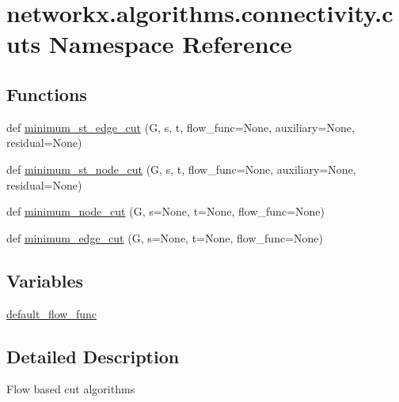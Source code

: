 \hypertarget{namespacenetworkx_1_1algorithms_1_1connectivity_1_1cuts}{}\section{networkx.\+algorithms.\+connectivity.\+cuts Namespace Reference}
\label{namespacenetworkx_1_1algorithms_1_1connectivity_1_1cuts}
\subsection*{Functions}
\begin{DoxyCompactItemize}
\item 
def \hyperlink{namespacenetworkx_1_1algorithms_1_1connectivity_1_1cuts_a1c011e06a29132aba8d9d4a0b79506ae}{minimum\+\_\+st\+\_\+edge\+\_\+cut} (G, s, t, flow\+\_\+func=None, auxiliary=None, residual=None)
\item 
def \hyperlink{namespacenetworkx_1_1algorithms_1_1connectivity_1_1cuts_a3a3ae336abcce0cc7ca6aac034920272}{minimum\+\_\+st\+\_\+node\+\_\+cut} (G, s, t, flow\+\_\+func=None, auxiliary=None, residual=None)
\item 
def \hyperlink{namespacenetworkx_1_1algorithms_1_1connectivity_1_1cuts_a95772f88e75165ca90e55d41fcaa0476}{minimum\+\_\+node\+\_\+cut} (G, s=None, t=None, flow\+\_\+func=None)
\item 
def \hyperlink{namespacenetworkx_1_1algorithms_1_1connectivity_1_1cuts_ad566bf6020381d58de3e54ff4709fc61}{minimum\+\_\+edge\+\_\+cut} (G, s=None, t=None, flow\+\_\+func=None)
\end{DoxyCompactItemize}
\subsection*{Variables}
\begin{DoxyCompactItemize}
\item 
\hyperlink{namespacenetworkx_1_1algorithms_1_1connectivity_1_1cuts_a18744b7e797aed1003513ade19d0bcd1}{default\+\_\+flow\+\_\+func}
\end{DoxyCompactItemize}


\subsection{Detailed Description}
\begin{DoxyVerb}Flow based cut algorithms
\end{DoxyVerb}
 

